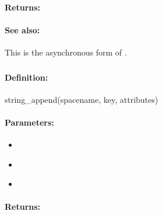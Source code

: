 \paragraph{Returns:}


\paragraph{See also:}  This is the asynchronous form of .

\pagebreak
\subsubsection{}
\label{api:ruby:string_append}


\paragraph{Definition:}
\begin{rubycode}
string_append(spacename, key, attributes)
\end{rubycode}

\paragraph{Parameters:}
\begin{itemize}[noitemsep]
\item {}\\

\item {}\\

\item {}\\

\end{itemize}

\paragraph{Returns:}


\pagebreak
\subsubsection{}
\label{api:ruby:async_string_append}


